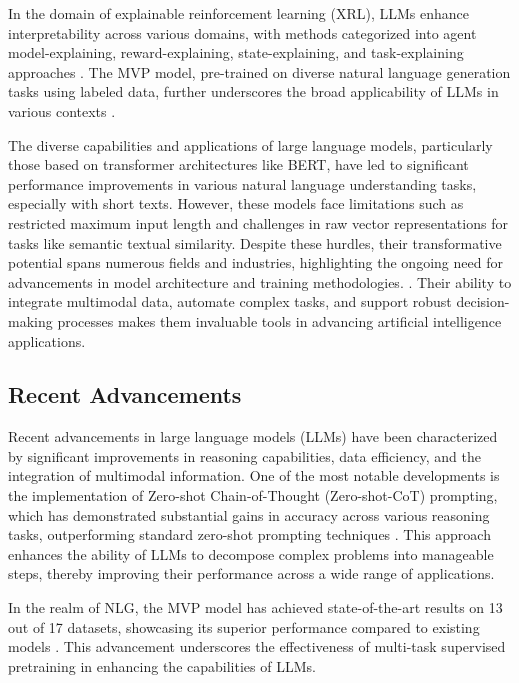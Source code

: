 In the domain of explainable reinforcement learning (XRL), LLMs enhance interpretability across various domains, with methods categorized into agent model-explaining, reward-explaining, state-explaining, and task-explaining approaches \cite{qing2023surveyexplainablereinforcementlearning}. The MVP model, pre-trained on diverse natural language generation tasks using labeled data, further underscores the broad applicability of LLMs in various contexts \cite{tang2023mvpmultitasksupervisedpretraining}.



The diverse capabilities and applications of large language models, particularly those based on transformer architectures like BERT, have led to significant performance improvements in various natural language understanding tasks, especially with short texts. However, these models face limitations such as restricted maximum input length and challenges in raw vector representations for tasks like semantic textual similarity. Despite these hurdles, their transformative potential spans numerous fields and industries, highlighting the ongoing need for advancements in model architecture and training methodologies. \cite{ginzburg2021selfsuperviseddocumentsimilarityranking}. Their ability to integrate multimodal data, automate complex tasks, and support robust decision-making processes makes them invaluable tools in advancing artificial intelligence applications.



\subsection{Recent Advancements} \label{subsec:Recent Advancements}

Recent advancements in large language models (LLMs) have been characterized by significant improvements in reasoning capabilities, data efficiency, and the integration of multimodal information. One of the most notable developments is the implementation of Zero-shot Chain-of-Thought (Zero-shot-CoT) prompting, which has demonstrated substantial gains in accuracy across various reasoning tasks, outperforming standard zero-shot prompting techniques \cite{kojima2022large}. This approach enhances the ability of LLMs to decompose complex problems into manageable steps, thereby improving their performance across a wide range of applications.



In the realm of NLG, the MVP model has achieved state-of-the-art results on 13 out of 17 datasets, showcasing its superior performance compared to existing models \cite{tang2023mvpmultitasksupervisedpretraining}. This advancement underscores the effectiveness of multi-task supervised pretraining in enhancing the capabilities of LLMs.



